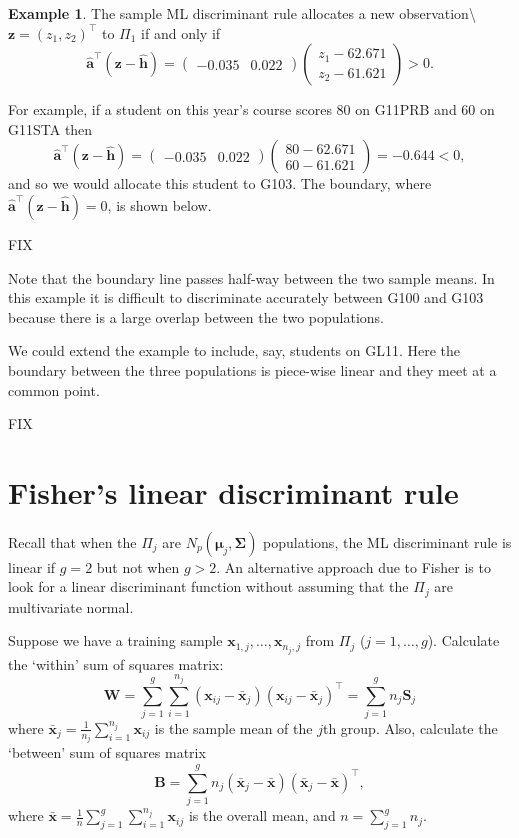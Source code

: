 \documentclass[]{book}
\theoremstyle{definition}
\theoremstyle{definition}
\newtheorem{example}{Example}[chapter]
\theoremstyle{definition}
\theoremstyle{remark}
\begin{document}
\begin{example}
The sample ML discriminant rule allocates a new observation\textbackslash{}
\(\boldsymbol z= (z_1, z_2)^\top\) to \(\Pi_1\) if and only if
\[ \hat{\boldsymbol a}^\top (\boldsymbol z- \hat{\boldsymbol h}) = \begin{pmatrix} -0.035 & 0.022 \end{pmatrix} \begin{pmatrix} z_1 - 62.671 \\ z_2 - 61.621 \end{pmatrix} > 0.\]

For example, if a student on this year's course scores 80 on G11PRB and 60 on G11STA then
\[ \hat{\boldsymbol a}^\top (\boldsymbol z- \hat{\boldsymbol h}) = \begin{pmatrix} -0.035 & 0.022 \end{pmatrix} \begin{pmatrix} 80 - 62.671 \\ 60 - 61.621 \end{pmatrix} = -0.644 < 0,\]
and so we would allocate this student to G103. The boundary, where \(\hat{\boldsymbol a}^\top (\boldsymbol z- \hat{\boldsymbol h}) = 0\), is shown below.

FIX

Note that the boundary line passes half-way between the two sample means. In this example it is difficult to discriminate accurately between G100 and G103 because there is a large overlap between the two populations.

We could extend the example to include, say, students on GL11. Here the boundary between the three populations is piece-wise linear and they meet at a common point.

FIX
\end{example}

\hypertarget{fishers-linear-discriminant-rule}{%
\section{Fisher's linear discriminant rule}\label{fishers-linear-discriminant-rule}}

Recall that when the \(\Pi_j\) are \(N_p ( \boldsymbol{\mu}_j, {\mathbf \Sigma})\) populations, the ML
discriminant rule is linear if \(g=2\) but not when \(g>2\). An alternative approach due to Fisher is to look for a linear discriminant function without assuming that the \(\Pi_j\) are multivariate normal.

Suppose we have a training sample \(\boldsymbol x_{1,j}, \ldots, \boldsymbol x_{n_j,j}\) from \(\Pi_j\) (\(j=1,\ldots,g\)). Calculate the `within' sum of squares matrix:
\[ \boldsymbol W= \sum_{j=1}^g \sum_{i=1}^{n_j} (\boldsymbol x_{ij} - \bar{\boldsymbol x}_j) (\boldsymbol x_{ij} - \bar{\boldsymbol x}_j)^\top  = \sum_{j=1}^g n_j \boldsymbol S_j \]
where \(\bar{\boldsymbol x}_j= \frac{1}{n_j} \sum_{i=1}^{n_j} \boldsymbol x_{ij}\) is the sample mean of the \(j\)th group. Also, calculate the `between' sum of squares matrix
\[ \boldsymbol B= \sum_{j=1}^g n_j (\bar{\boldsymbol x}_j - \bar{\boldsymbol x}) (\bar{\boldsymbol x}_j - \bar{\boldsymbol x})^\top ,\]
where \(\bar{\boldsymbol x} = \frac{1}{n} \sum_{j=1}^g \sum_{i=1}^{n_j} \boldsymbol x_{ij}\) is the overall mean, and \(n=\sum_{j=1}^g n_j\).
\end{document}
